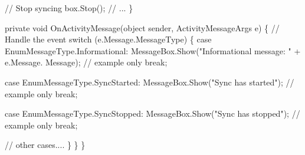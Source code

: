 \begin{DoxyCode}
              \textcolor{comment}{// Stop syncing}
              box.Stop();
              \textcolor{comment}{// ...}
          \}

          \textcolor{keyword}{private} \textcolor{keywordtype}{void} OnActivityMessage(\textcolor{keywordtype}{object} sender, ActivityMessageArgs e)
          \{
              \textcolor{comment}{// Handle the event}
              \textcolor{keywordflow}{switch} (e.Message.MessageType)
              \{
                  \textcolor{keywordflow}{case} EnumMessageType.Informational:
                      MessageBox.Show(\textcolor{stringliteral}{"Informational message: "} + e.Message.
      Message);  \textcolor{comment}{// example only}
                      \textcolor{keywordflow}{break};

                  \textcolor{keywordflow}{case} EnumMessageType.SyncStarted:
                      MessageBox.Show(\textcolor{stringliteral}{"Sync has started"});    \textcolor{comment}{// example only}
                      \textcolor{keywordflow}{break};

                  \textcolor{keywordflow}{case} EnumMessageType.SyncStopped:
                      MessageBox.Show(\textcolor{stringliteral}{"Sync has stopped"});    \textcolor{comment}{// example only}
                      \textcolor{keywordflow}{break};

                  \textcolor{comment}{// other cases....}
              \}
          \}
      \}
\end{DoxyCode}
 